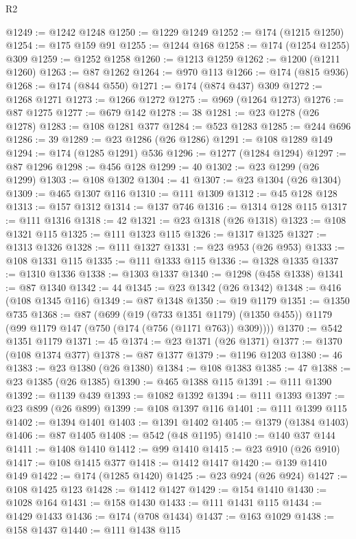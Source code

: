 \begin{lexlean}{R2}
\begin{coremodule}
@1249 := @1242 @1248
@1250 := @1229 @1249
@1252 := @174 (@1215 @1250)
@1254 := @175 @159 @91
@1255 := @1244 @168
@1258 := @174 (@1254 @1255) @309
@1259 := @1252 @1258
@1260 := @1213 @1259
@1262 := @1200 (@1211 @1260)
@1263 := @87 @1262
@1264 := @970 @113
@1266 := @174 (@815 @936)
@1268 := @174 (@844 @550)
@1271 := @174 (@874 @437) @309
@1272 := @1268 @1271
@1273 := @1266 @1272
@1275 := @969 (@1264 @1273)
@1276 := @87 @1275
@1277 := @679 @142
@1278 := 38
@1281 := @23 @1278 (@26 @1278)
@1283 := @108 @1281 @377
@1284 := @523 @1283
@1285 := @244 @696
@1286 := 39
@1289 := @23 @1286 (@26 @1286)
@1291 := @108 @1289 @149
@1294 := @174 (@1285 @1291) @536
@1296 := @1277 (@1284 @1294)
@1297 := @87 @1296
@1298 := @456 @128
@1299 := 40
@1302 := @23 @1299 (@26 @1299)
@1303 := @108 @1302
@1304 := 41
@1307 := @23 @1304 (@26 @1304)
@1309 := @465 @1307 @116
@1310 := @111 @1309
@1312 := @45 @128 @128
@1313 := @157 @1312
@1314 := @137 @746
@1316 := @1314 @128 @115
@1317 := @111 @1316
@1318 := 42
@1321 := @23 @1318 (@26 @1318)
@1323 := @108 @1321 @115
@1325 := @111 @1323 @115
@1326 := @1317 @1325
@1327 := @1313 @1326
@1328 := @111 @1327
@1331 := @23 @953 (@26 @953)
@1333 := @108 @1331 @115
@1335 := @111 @1333 @115
@1336 := @1328 @1335
@1337 := @1310 @1336
@1338 := @1303 @1337
@1340 := @1298 (@458 @1338)
@1341 := @87 @1340
@1342 := 44
@1345 := @23 @1342 (@26 @1342)
@1348 := @416 (@108 @1345 @116)
@1349 := @87 @1348
@1350 := @19 @1179
@1351 := @1350 @735
@1368 := @87
    (@699
      (@19 (@733 @1351 @1179) (@1350 @455))
      @1179
      (@99 @1179 @147 (@750 (@174 (@756 (@1171 @763)) @309))))
@1370 := @542 @1351 @1179
@1371 := 45
@1374 := @23 @1371 (@26 @1371)
@1377 := @1370 (@108 @1374 @377)
@1378 := @87 @1377
@1379 := @1196 @1203
@1380 := 46
@1383 := @23 @1380 (@26 @1380)
@1384 := @108 @1383
@1385 := 47
@1388 := @23 @1385 (@26 @1385)
@1390 := @465 @1388 @115
@1391 := @111 @1390
@1392 := @1139 @439
@1393 := @1082 @1392
@1394 := @111 @1393
@1397 := @23 @899 (@26 @899)
@1399 := @108 @1397 @116
@1401 := @111 @1399 @115
@1402 := @1394 @1401
@1403 := @1391 @1402
@1405 := @1379 (@1384 @1403)
@1406 := @87 @1405
@1408 := @542 (@48 @1195)
@1410 := @140 @37 @144
@1411 := @1408 @1410
@1412 := @99 @1410
@1415 := @23 @910 (@26 @910)
@1417 := @108 @1415 @377
@1418 := @1412 @1417
@1420 := @139 @1410 @149
@1422 := @174 (@1285 @1420)
@1425 := @23 @924 (@26 @924)
@1427 := @108 @1425 @123
@1428 := @1412 @1427
@1429 := @154 @1410
@1430 := @1028 @164
@1431 := @158 @1430
@1433 := @111 @1431 @115
@1434 := @1429 @1433
@1436 := @174 (@708 @1434)
@1437 := @163 @1029
@1438 := @158 @1437
@1440 := @111 @1438 @115

\end{coremodule}
\end{lexlean}
